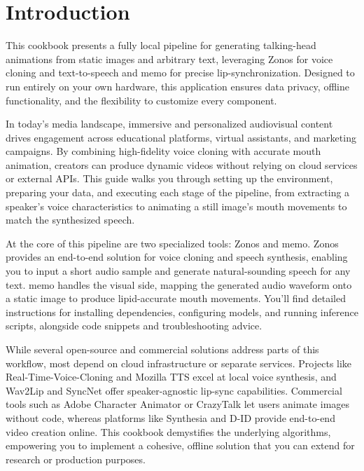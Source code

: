 \section{Introduction}

This cookbook presents a fully local pipeline for generating talking-head animations from static
images and arbitrary text, leveraging \gls{Zonos} for voice cloning and text-to-speech and
\gls{memo} for precise lip-synchronization. Designed to run entirely on your own hardware, this
application ensures data privacy, offline functionality, and the flexibility to customize every
component.

In today’s media landscape, immersive and personalized audiovisual content drives engagement across
educational platforms, virtual assistants, and marketing campaigns. By combining high-fidelity voice
cloning with accurate mouth animation, creators can produce dynamic videos without relying on cloud
services or external APIs. This guide walks you through setting up the environment, preparing your
data, and executing each stage of the pipeline, from extracting a speaker’s voice characteristics to
animating a still image’s mouth movements to match the synthesized speech.

At the core of this pipeline are two specialized tools: \gls{Zonos} and \gls{memo}. \gls{Zonos}
provides an end-to-end solution for voice cloning and speech synthesis, enabling you to input a
short audio sample and generate natural-sounding speech for any text. \gls{memo} handles the visual
side, mapping the generated audio waveform onto a static image to produce lipid-accurate mouth
movements. You’ll find detailed instructions for installing dependencies, configuring models, and
running inference scripts, alongside code snippets and troubleshooting advice.

While several open-source and commercial solutions address parts of this workflow, most depend on
cloud infrastructure or separate services. Projects like Real-Time-Voice-Cloning and Mozilla TTS
excel at local voice synthesis, and Wav2Lip and SyncNet offer speaker-agnostic lip-sync
capabilities. Commercial tools such as Adobe Character Animator or CrazyTalk let users animate
images without code, whereas platforms like Synthesia and D-ID provide end-to-end video creation
online. This cookbook demystifies the underlying algorithms, empowering you to implement a cohesive,
offline solution that you can extend for research or production purposes.

